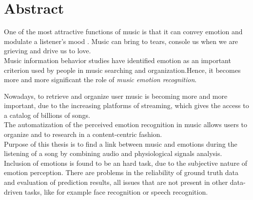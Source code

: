\chapter{Abstract}
\label{Abstract}
\thispagestyle{empty}

\indent One of the most attractive functions of music is that it can convey emotion and modulate a listener's mood \cite{feng2003popular}. Music can bring to tears, console us when we are grieving and drive us to love.
\\
Music information behavior studies have identified emotion as an important criterion used by people in music searching and organization.Hence, it becomes more and more significant the role of \textit{music emotion recognition}.
\\ \indent

Nowadays, to retrieve and organize user music is becoming more and more important, due to the increasing platforms of streaming, which gives the access to a catalog of billions of songs.
\\
The automatization of the perceived emotion recognition in music allows users to organize and to research in a content-centric fashion.
\\ \indent
Purpose of this thesis is to find a link between music and emotions during the listening of a song by combining audio and physiological signals analysis.
\\ \indent
Inclusion of emotions is found to be an hard task, due to the subjective nature of emotion perception. There are problems in the reliability of ground truth data and evaluation of prediction results, all issues that are not present in other data-driven tasks, like for example face recognition or speech recognition.